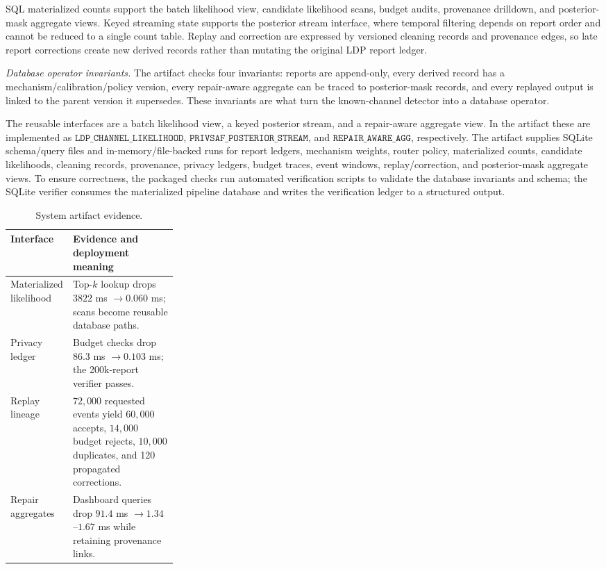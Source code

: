 \documentclass[conference]{IEEEtran}
\begin{document}
SQL materialized counts support the batch likelihood view, candidate likelihood scans, budget audits, provenance drilldown, and posterior-mask aggregate views. Keyed streaming state supports the posterior stream interface, where temporal filtering depends on report order and cannot be reduced to a single count table. Replay and correction are expressed by versioned cleaning records and provenance edges, so late report corrections create new derived records rather than mutating the original LDP report ledger.

\noindent\emph{Database operator invariants.}
The artifact checks four invariants: reports are append-only, every derived record has a mechanism/calibration/policy version, every repair-aware aggregate can be traced to posterior-mask records, and every replayed output is linked to the parent version it supersedes. These invariants are what turn the known-channel detector into a database operator.

The reusable interfaces are a batch likelihood view, a keyed posterior stream, and a repair-aware aggregate view. In the artifact these are implemented as \(\texttt{LDP\_CHANNEL\_LIKELIHOOD}\), \(\texttt{PRIVSAF\_POSTERIOR\_STREAM}\), and \(\texttt{REPAIR\_AWARE\_AGG}\), respectively. The artifact supplies SQLite schema/query files and in-memory/file-backed runs for report ledgers, mechanism weights, router policy, materialized counts, candidate likelihoods, cleaning records, provenance, privacy ledgers, budget traces, event windows, replay/correction, and posterior-mask aggregate views. To ensure correctness, the packaged checks run automated verification scripts to validate the database invariants and schema; the SQLite verifier consumes the materialized pipeline database and writes the verification ledger to a structured output.

\begin{table}[t]
\centering
\caption{System artifact evidence.}
\label{tab:system_artifact_evidence}
\scriptsize
\setlength{\tabcolsep}{2pt}
\renewcommand{\arraystretch}{0.9}
\begin{tabularx}{\columnwidth}{p{0.28\linewidth}Y}
\toprule
Interface & Evidence and deployment meaning \\
\midrule
Materialized likelihood & Top-\(k\) lookup drops \(3822\) ms \(\rightarrow0.060\) ms; scans become reusable database paths. \\
Privacy ledger & Budget checks drop \(86.3\) ms \(\rightarrow0.103\) ms; the 200k-report verifier passes. \\
Replay lineage & \(72{,}000\) requested events yield \(60{,}000\) accepts, \(14{,}000\) budget rejects, \(10{,}000\) duplicates, and 120 propagated corrections. \\
Repair aggregates & Dashboard queries drop \(91.4\) ms \(\rightarrow1.34\)--\(1.67\) ms while retaining provenance links. \\
\bottomrule
\end{tabularx}
\end{table}
\end{document}
